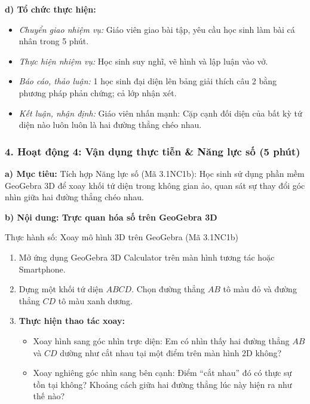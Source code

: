 \documentclass[12pt, a4paper]{article}
\begin{document}
\noindent \textbf{d) Tổ chức thực hiện:}
\begin{itemize}[leftmargin=0.8cm]
    \item \textit{Chuyển giao nhiệm vụ:} Giáo viên giao bài tập, yêu cầu học sinh làm bài cá nhân trong 5 phút.
    \item \textit{Thực hiện nhiệm vụ:} Học sinh suy nghĩ, vẽ hình và lập luận vào vở.
    \item \textit{Báo cáo, thảo luận:} 1 học sinh đại diện lên bảng giải thích câu 2 bằng phương pháp phản chứng; cả lớp nhận xét.
    \item \textit{Kết luận, nhận định:} Giáo viên nhấn mạnh: Cặp cạnh đối diện của bất kỳ tứ diện nào luôn luôn là hai đường thẳng chéo nhau.
\end{itemize}

\subsubsection*{4. Hoạt động 4: Vận dụng thực tiễn & Năng lực số (5 phút)}

\noindent \textbf{a) Mục tiêu:}
Tích hợp Năng lực số (Mã 3.1NC1b): Học sinh sử dụng phần mềm GeoGebra 3D để xoay khối tứ diện trong không gian ảo, quan sát sự thay đổi góc nhìn giữa hai đường thẳng chéo nhau.

\noindent \textbf{b) Nội dung: Trực quan hóa số trên GeoGebra 3D}
\begin{aibox}{Thực hành số: Xoay mô hình 3D trên GeoGebra (Mã 3.1NC1b)}
\begin{enumerate}[leftmargin=0.6cm]
    \item Mở ứng dụng GeoGebra 3D Calculator trên màn hình tương tác hoặc Smartphone.
    \item Dựng một khối tứ diện $ABCD$. Chọn đường thẳng $AB$ tô màu đỏ và đường thẳng $CD$ tô màu xanh dương.
    \item \textbf{Thực hiện thao tác xoay:}
    \begin{itemize}
        \item Xoay hình sang góc nhìn trực diện: Em có nhìn thấy hai đường thẳng $AB$ và $CD$ dường như cắt nhau tại một điểm trên màn hình $2\text{D}$ không?
        \item Xoay nghiêng góc nhìn sang bên cạnh: Điểm ``cắt nhau'' đó có thực sự tồn tại không? Khoảng cách giữa hai đường thẳng lúc này hiện ra như thế nào?
    \end{itemize}
\end{enumerate}
\end{aibox}
\end{document}
